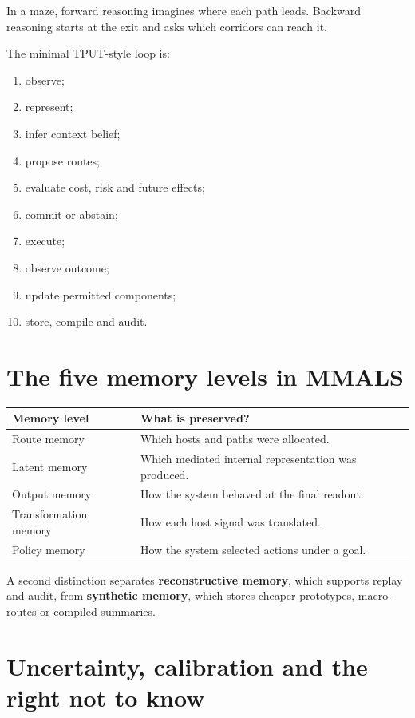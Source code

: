 \documentclass[11pt,a4paper]{article}
\newcommand{\tablehead}[1]{\cellcolor{DeepTeal}\color{white}\bfseries #1}
\begin{document}
\begin{twelvebox}
In a maze, forward reasoning imagines where each path leads. Backward reasoning starts at the exit and asks which corridors can reach it.
\end{twelvebox}

The minimal TPUT-style loop is:
\begin{enumerate}[leftmargin=1.6em]
\item observe;
\item represent;
\item infer context belief;
\item propose routes;
\item evaluate cost, risk and future effects;
\item commit or abstain;
\item execute;
\item observe outcome;
\item update permitted components;
\item store, compile and audit.
\end{enumerate}

\section{The five memory levels in MMALS}

\begin{tabularx}{\textwidth}{p{3.2cm}X}
\toprule
\tablehead{Memory level} & \tablehead{What is preserved?}\\
\midrule
Route memory & Which hosts and paths were allocated.\\
Latent memory & Which mediated internal representation was produced.\\
Output memory & How the system behaved at the final readout.\\
Transformation memory & How each host signal was translated.\\
Policy memory & How the system selected actions under a goal.\\
\bottomrule
\end{tabularx}

A second distinction separates \textbf{reconstructive memory}, which supports replay and audit, from \textbf{synthetic memory}, which stores cheaper prototypes, macro-routes or compiled summaries.

\newpage
\section{Uncertainty, calibration and the right not to know}
\end{document}
